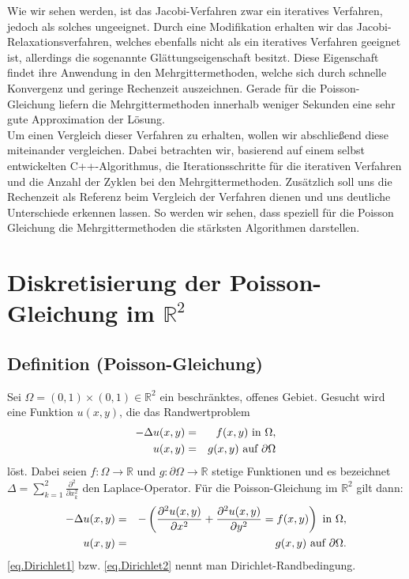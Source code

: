 Wie wir sehen werden, ist das Jacobi-Verfahren zwar ein iteratives Verfahren, jedoch als solches ungeeignet. Durch eine Modifikation erhalten wir das Jacobi-Relaxationsverfahren, welches ebenfalls nicht als ein iteratives Verfahren geeignet ist, allerdings die sogenannte Glättungseigenschaft besitzt. Diese Eigenschaft findet ihre Anwendung in den Mehrgittermethoden, welche sich durch schnelle Konvergenz und geringe Rechenzeit auszeichnen. Gerade für die Poisson-Gleichung liefern die Mehrgittermethoden innerhalb weniger Sekunden eine sehr gute Approximation der Lösung.\\
Um einen Vergleich dieser Verfahren zu erhalten, wollen wir abschließend diese miteinander vergleichen. Dabei betrachten wir, basierend auf einem selbst entwickelten C++-Algorithmus, die Iterationsschritte für die iterativen Verfahren und die Anzahl der Zyklen bei den Mehrgittermethoden. Zusätzlich soll uns die Rechenzeit als Referenz beim Vergleich der Verfahren dienen und uns deutliche Unterschiede erkennen lassen. So werden wir sehen, dass speziell für die Poisson Gleichung die Mehrgittermethoden die stärksten Algorithmen darstellen.


\chapter{Diskretisierung der Poisson-Gleichung im $\mathbb{R}^{2}$} \label{c.Diskretisierte Poisson-Gleichung}

\section{Definition (Poisson-Gleichung)}\label{s.Poisson-Gleichung}

Sei $\Omega = (0,1)\times(0,1) \in \mathbb{R}^{2}$ ein beschränktes, offenes Gebiet. Gesucht wird eine Funktion $u(x,y)$, die das Randwertproblem
\begin{eqnarray}
-\Delta u(x,y) &=& f(x,y) \textnormal{ in } \Omega, \\
u(x,y) &=& g(x,y) \textnormal{ auf } \partial \Omega\label{eq.Dirichlet1}
\end{eqnarray}
löst.
Dabei seien $f: \Omega \rightarrow \mathbb{R}$ und $g: \partial\Omega \rightarrow \mathbb{R}$ stetige Funktionen und es bezeichnet $\Delta = \sum\limits_{k=1}^{2} \frac {\partial^{2}} {\partial x_{k}^{2}}$ den Laplace-Operator. Für die Poisson-Gleichung im $\mathbb{R}^{2}$ gilt dann:
\begin{eqnarray}
-\Delta u(x,y) &=& - \left( \frac {\partial^{2} u(x,y)} {\partial x^{2}} + \frac {\partial^{2} u(x,y)} {\partial y^{2}} = f(x,y) \right) \textnormal{ in } \Omega, \\
u(x,y) &=& g(x,y) \textnormal{ auf } \partial \Omega.\label{eq.Dirichlet2}
\end{eqnarray}
\autoref{eq.Dirichlet1} bzw. \autoref{eq.Dirichlet2} nennt man Dirichlet-Randbedingung.\\

